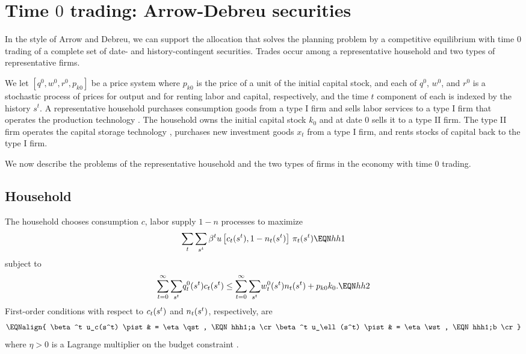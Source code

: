 \section{Time $0$ trading: Arrow-Debreu securities}
In the style of Arrow and Debreu, we can support the allocation
that solves the planning problem by a competitive equilibrium with
time $0$ trading of a complete set of date- and
history-contingent securities.  Trades occur among a
representative household and two types of representative
firms.


We let $[q^0,  w^0, r^0, p_{k0}]$ be a price system where
$p_{k0}$ is the price of a unit of the initial capital stock, and
each of $q^0$, $w^0$, and $r^0$ is a stochastic process of prices for
output and for renting labor and capital, respectively, and   the
time $t$ component of each is indexed by the history $s^t$. A
representative household purchases consumption goods from a type I
firm and sells labor services to a type I firm that operates
the production technology .
The household owns the initial capital stock $k_0$ and at date
$0$ sells it to a type II firm.  The type II firm operates the
capital storage technology , purchases new investment
goods $x_{t}$ from a type I firm, and rents stocks of capital back
to the type I firm.


 We now describe the problems of the
representative household and the two types of firms in the economy
with time $0$ trading.


\subsection{Household}
The household chooses consumption $c$, labor supply $1-n$ processes to maximize
$$ \sum_t\sum_{s^t} \beta^t u\left[\cst, 1-\nst\right]\,\pist  \EQN hh1 $$
subject to
$$ \sumst \qst \cst \leq \sumst \wst \nst + p_{k0} k_0. \EQN hh2  $$
First-order conditions with respect to ${c_t(s^t)}$ and ${n_t(s^t)}$, respectively,
are
$$\EQNalign{ \beta^t u_c(s^t) \pist & = \eta\qst, \EQN hhh1;a \cr
                   \beta^t u_\ell(s^t) \pist & = \eta \wst, \EQN hhh1;b \cr}$$
where $\eta>0$ is a Lagrange multiplier on the budget constraint
.


